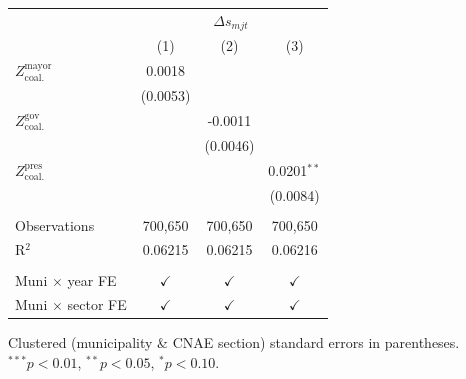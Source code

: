 \begingroup
\centering
\begin{tabular}{lccc}
   \toprule
    & \multicolumn{3}{c}{$\Delta s_{mjt}$}\\
                                       & (1)           & (2)           & (3)\\  
   \midrule 
   $Z^{\text{mayor}}_{\text{coal.}}$   & 0.0018        &               &   \\   
                                       & (0.0053)      &               &   \\   
   $Z^{\text{gov}}_{\text{coal.}}$     &               & -0.0011       &   \\   
                                       &               & (0.0046)      &   \\   
   $Z^{\text{pres}}_{\text{coal.}}$    &               &               & 0.0201$^{**}$\\   
                                       &               &               & (0.0084)\\   
    \\
   Observations                        & 700,650       & 700,650       & 700,650\\  
   R$^2$                               & 0.06215       & 0.06215       & 0.06216\\  
    \\
   Muni $\times$ year FE               & $\checkmark$  & $\checkmark$  & $\checkmark$\\   
   Muni $\times$ sector FE             & $\checkmark$  & $\checkmark$  & $\checkmark$\\   
   \bottomrule
\end{tabular}
 
\par \raggedright 
Clustered (municipality \& CNAE section) standard errors in parentheses. $^{***}p<0.01$, $^{**}p<0.05$, $^{*}p<0.10$.
\par\endgroup
